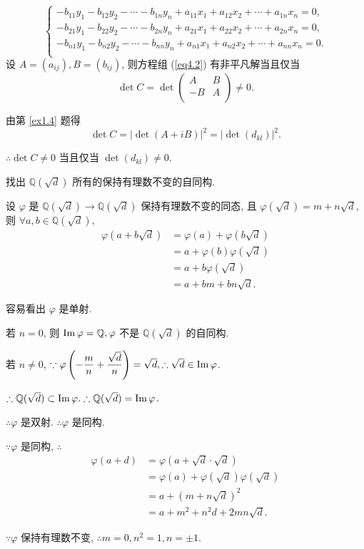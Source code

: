 \documentclass[UTF8]{ctexart}
\begin{document}
\begin{solution}
\begin{equation}
\begin{cases}
            -b_{11}y_1-b_{12}y_2-\cdots-b_{1n}y_n+a_{11}x_1+a_{12}x_2+\cdots+a_{1n}x_n=0, \\
            -b_{21}y_1-b_{22}y_2-\cdots-b_{2n}y_n+a_{21}x_1+a_{22}x_2+\cdots+a_{2n}x_n=0, \\
            -b_{n1}y_1-b_{n2}y_2-\cdots-b_{nn}y_n+a_{n1}x_1+a_{n2}x_2+\cdots+a_{nn}x_n=0. \\
        \end{cases}
    \end{equation}
    设 $A=(a_{ij}),B=(b_{ij})$, 则方程组 (\ref{eq4.2}) 有非平凡解当且仅当
    \[\det C=\det\begin{pmatrix}
        A & B \\
        -B & A \\
    \end{pmatrix}\neq0.\]

    由第 \ref{ex1.4} 题得
    \[\det C=|\det(A+iB)|^2=|\det(d_{kl})|^2.\]

    $\therefore\det C\neq0$ 当且仅当 $\det(d_{kl})\neq0$.
\end{solution}
\begin{exercise}%
    找出 $\mathbb{Q}(\sqrt{d})$ 所有的保持有理数不变的自同构.
\end{exercise}
\begin{solution}
    设 $\varphi$ 是 $\mathbb{Q}(\sqrt{d})\to\mathbb{Q}(\sqrt{d})$ 保持有理数不变的同态, 且 $\varphi(\sqrt{d})=m+n\sqrt{d}$, 则 $\forall a,b\in\mathbb{Q}(\sqrt{d})$,
    \begin{align*}
        \varphi(a+b\sqrt{d}) & =\varphi(a)+\varphi(b\sqrt{d}) \\
        & =a+\varphi(b)\varphi(\sqrt{d}) \\
        & =a+b\varphi(\sqrt{d}) \\
        & =a+bm+bn\sqrt{d}.
    \end{align*}

    容易看出 $\varphi$ 是单射.

    若 $n=0$, 则 $\operatorname{Im} \varphi=\mathbb{Q},\varphi$ 不是 $\mathbb{Q}(\sqrt{d})$ 的自同构.

    若 $n\neq0$, $\because\varphi\left(-\dfrac{m}{n}+\dfrac{\sqrt{d}}{n}\right)=\sqrt{d},\therefore\sqrt{d}\in\operatorname{Im} \varphi$.

    $\therefore\mathbb{Q}(\sqrt{d})\subset\operatorname{Im} \varphi.\therefore\mathbb{Q}(\sqrt{d})=\operatorname{Im} \varphi$.

    $\therefore\varphi$ 是双射. $\therefore\varphi$ 是同构.

    $\because\varphi$ 是同构, $\therefore$
    \begin{align*}
        \varphi(a+d) & =\varphi(a+\sqrt{d}\cdot\sqrt{d}) \\
        & =\varphi(a)+\varphi(\sqrt{d})\varphi(\sqrt{d}) \\
        & =a+(m+n\sqrt{d})^2 \\
        & =a+m^2+n^2d+2mn\sqrt{d}.
    \end{align*}

    $\because\varphi$ 保持有理数不变, $\therefore m=0,n^2=1,n=\pm1$.
\end{solution}
\end{document}
